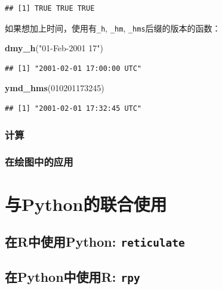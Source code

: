 \documentclass[]{book}
\newenvironment{Shaded}{\begin{snugshade}}{\end{snugshade}}
\newcommand{\DecValTok}[1]{\textcolor[rgb]{0.00,0.00,0.81}{#1}}
\newcommand{\KeywordTok}[1]{\textcolor[rgb]{0.13,0.29,0.53}{\textbf{#1}}}
\newcommand{\NormalTok}[1]{#1}
\newcommand{\StringTok}[1]{\textcolor[rgb]{0.31,0.60,0.02}{#1}}
\begin{document}
\begin{verbatim}
## [1] TRUE TRUE TRUE
\end{verbatim}

如果想加上时间，使用有\texttt{\_h}, \texttt{\_hm}, \texttt{\_hms}后缀的版本的函数：

\begin{Shaded}
\begin{Highlighting}[]
\KeywordTok{dmy_h}\NormalTok{(}\StringTok{"01-Feb-2001 17"}\NormalTok{)}
\end{Highlighting}
\end{Shaded}

\begin{verbatim}
## [1] "2001-02-01 17:00:00 UTC"
\end{verbatim}

\begin{Shaded}
\begin{Highlighting}[]
\KeywordTok{ymd_hms}\NormalTok{(}\DecValTok{010201173245}\NormalTok{)}
\end{Highlighting}
\end{Shaded}

\begin{verbatim}
## [1] "2001-02-01 17:32:45 UTC"
\end{verbatim}

\subsection{计算}

\hypertarget{-1}{%
\subsection{在绘图中的应用}\label{-1}}

\hypertarget{python}{%
\chapter{与Python的联合使用}\label{python}}

\hypertarget{reticulate}{%
\section{\texorpdfstring{在R中使用Python: \texttt{reticulate}}{在R中使用Python: reticulate}}\label{reticulate}}

\hypertarget{rpy}{%
\section{\texorpdfstring{在Python中使用R: \texttt{rpy}}{在Python中使用R: rpy}}\label{rpy}}
\end{document}
